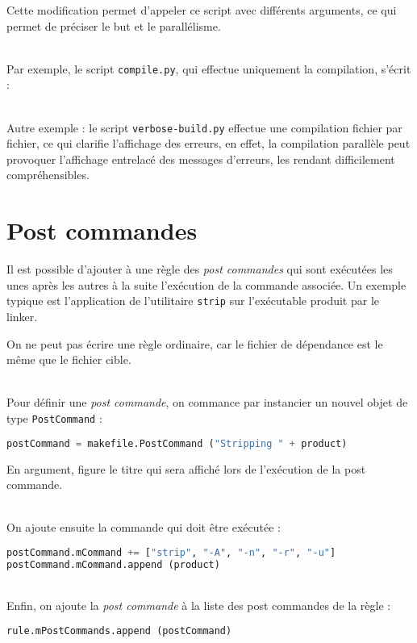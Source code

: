 \documentclass[a4paper,12pt,obeyspaces,openany]{extarticle}
\begin{document}
Cette modification permet d'appeler ce script avec différents arguments, ce qui permet de préciser le but et le parallélisme.

~\\Par exemple, le script \texttt{compile.py}, qui effectue uniquement la compilation, s'écrit :



~\\Autre exemple : le script \texttt{verbose-build.py} effectue une compilation fichier par fichier, ce qui clarifie l'affichage des erreurs, en effet, la compilation parallèle peut provoquer l'affichage entrelacé des messages d'erreurs, les rendant difficilement compréhensibles.








\section{Post commandes}

Il est possible d'ajouter à une règle des \emph{post commandes} qui sont exécutées les unes après les autres à la suite l'exécution de la commande associée. Un exemple typique est l'application de l'utilitaire \texttt{strip} sur l'exécutable produit par le linker.

On ne peut pas écrire une règle ordinaire, car le fichier de dépendance est le même que le fichier cible.

~\\Pour définir une \emph{post commande}, on commance par instancier un nouvel objet de type \texttt{PostCommand} :
\begin{lstlisting}[language=py]
postCommand = makefile.PostCommand ("Stripping " + product)
\end{lstlisting}
En argument, figure le titre qui sera affiché lors de l'exécution de la post commande.

~\\On ajoute ensuite la commande qui doit être exécutée :
\begin{lstlisting}[language=py]
postCommand.mCommand += ["strip", "-A", "-n", "-r", "-u"]
postCommand.mCommand.append (product)
\end{lstlisting}

~\\Enfin, on ajoute la \emph{post commande} à la liste des post commandes de la règle :
\begin{lstlisting}[language=py]
rule.mPostCommands.append (postCommand)
\end{lstlisting}
\end{document}
